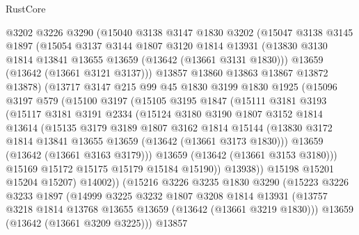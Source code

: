 \begin{lexlean}{RustCore}
\begin{coremodule}
        @3202
        @3226
        @3290
        (@15040
          @3138
          @3147
          @1830
          @3202
          (@15047
            @3138
            @3145
            @1897
            (@15054
              @3137
              @3144
              @1807
              @3120
              @1814
              @13931
              (@13830 @3130 @1814 @13841 @13655 @13659 (@13642 (@13661 @3131 @1830)))
              @13659
              (@13642 (@13661 @3121 @3137)))
            @13857
            @13860
            @13863
            @13867
            @13872
            @13878)
          (@13717
            @3147
            @215
            @99
            @45
            @1830
            @3199
            @1830
            @1925
            (@15096
              @3197
              @579
              (@15100
                @3197
                (@15105
                  @3195
                  @1847
                  (@15111
                    @3181
                    @3193
                    (@15117
                      @3181
                      @3191
                      @2334
                      (@15124
                        @3180
                        @3190
                        @1807
                        @3152
                        @1814
                        @13614
                        (@15135
                          @3179
                          @3189
                          @1807
                          @3162
                          @1814
                          @15144
                          (@13830 @3172 @1814 @13841 @13655 @13659 (@13642 (@13661 @3173 @1830)))
                          @13659
                          (@13642 (@13661 @3163 @3179)))
                        @13659
                        (@13642 (@13661 @3153 @3180)))
                      @15169
                      @15172
                      @15175
                      @15179
                      @15184
                      @15190))
                  @13938))
              @15198
              @15201
              @15204
              @15207)
            @14002))
        (@15216
          @3226
          @3235
          @1830
          @3290
          (@15223
            @3226
            @3233
            @1897
            (@14999
              @3225
              @3232
              @1807
              @3208
              @1814
              @13931
              (@13757 @3218 @1814 @13768 @13655 @13659 (@13642 (@13661 @3219 @1830)))
              @13659
              (@13642 (@13661 @3209 @3225)))
            @13857

\end{coremodule}
\end{lexlean}
